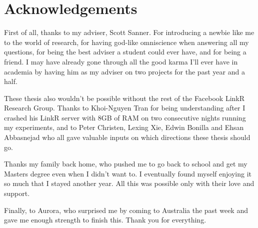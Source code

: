
\chapter*{Acknowledgements}
\label{cha:ack}

First of all, thanks to my adviser, Scott Sanner. For introducing a newbie like me to the world of research, for having god-like omniscience when answering all my questions, for being the best adviser a student could ever have, and for being a friend. I may have already gone through all the good karma I'll ever have in academia by having him as my adviser on two projects for the past year and a half.

These thesis also wouldn't be possible without the rest of the Facebook LinkR Research Group. Thanks to Khoi-Nguyen Tran for being understanding after I crashed his LinkR server with 8GB of RAM on two consecutive nights running my experiments, and to Peter Christen, Lexing Xie, Edwin Bonilla and Ehsan Abbasnejad who all gave valuable inputs on which directions these thesis should go.

Thanks my family back home, who pushed me to go back to school and get my Masters degree even when I didn't want to. I eventually found myself enjoying it so much that I stayed another year. All this was possible only with their love and support. 

Finally, to Aurora, who surprised me by coming to Australia the past week and gave me enough strength to finish this. Thank you for everything.



